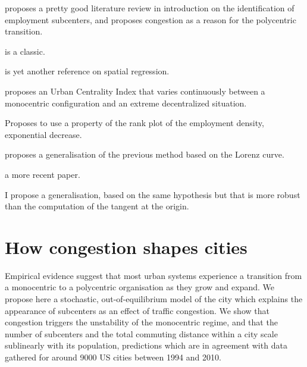 \cite{McMillen:2003} proposes a pretty good literature review in introduction on
the identification of employment subcenters, and proposes congestion as a reason
for the polycentric transition.

\cite{Tsai:2005} is a classic.

\cite{Griffith:2007} is yet another reference on spatial regression.

\cite{Pereira:2013} proposes an Urban Centrality Index that varies continuously
between a monocentric configuration and an extreme decentralized situation.

\cite{Louf:2013_polycentric} Proposes to use a property of the rank plot of the
employment density, exponential decrease.

\cite{Louail:2014} proposes a generalisation of the previous method based on the
Lorenz curve.

\cite{LeNechet:2015} a more recent paper.

I propose a generalisation, based on the same hypothesis but that is more robust
than the computation of the tangent at the origin.

\section{How congestion shapes cities}
\label{sec:how_congestion_shapes_cities}

Empirical evidence suggest that most urban systems experience a
transition from a monocentric to a polycentric organisation as they
grow and expand. We propose here a stochastic, out-of-equilibrium model of the
city which explains the appearance of subcenters as an effect of
traffic congestion. We show that congestion triggers the unstability
of the monocentric regime, and that the number of subcenters and the
total commuting distance within a city scale sublinearly with its
population, predictions which are in agreement with data gathered for
around 9000 US cities between 1994 and 2010.\\


